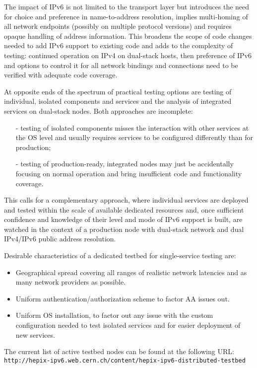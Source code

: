 The impact of IPv6 is not limited to the transport layer 
but introduces the need for choice and preference in name-to-address 
resolution, implies multi-homing of all network endpoints (possibly on 
multiple protocol versions) and requires opaque handling of address 
information. This broadens the scope of code changes needed to add
IPv6 support to existing code and adds to the complexity of testing:
continued operation on IPv4 on dual-stack hosts, then preference of IPv6 and 
options to control it for all network bindings and connections
need to be verified with adequate code coverage.
\par
At opposite ends of the spectrum of practical testing options are
testing of individual, isolated components and services and the analysis of 
integrated services on dual-stack nodes. Both approaches are incomplete:
\begin{itemize}
\item[-] testing of isolated components misses the interaction with other
services at the OS level and usually requires services to be configured
differently than for production;
\item[-] testing of production-ready, integrated nodes may just be 
accidentally focusing on normal operation and bring insufficient 
code and functionality coverage.
\end{itemize}
This calls for a complementary approach,
where individual services are deployed and tested within the scale of
available dedicated resources and, once sufficient confidence and knowledge
of their level and mode of IPv6 support is built, are watched in the context
of a production node with dual-stack network and dual IPv4/IPv6 public address
resolution.
\par
Desirable characteristics of a dedicated testbed for single-service testing are:
\begin{itemize}
\item Geographical spread covering all ranges of realistic network latencies
and as many network providers as possible.
\item Uniform authentication/authorization scheme to factor AA issues out.
\item Uniform OS installation, to factor out any issue with the custom 
configuration needed to test isolated services and for easier
deployment of new services.
\end{itemize}
The current list of active testbed nodes can be found at the following URL:\\
{\tt http://hepix-ipv6.web.cern.ch/content/hepix-ipv6-distributed-testbed}\\
